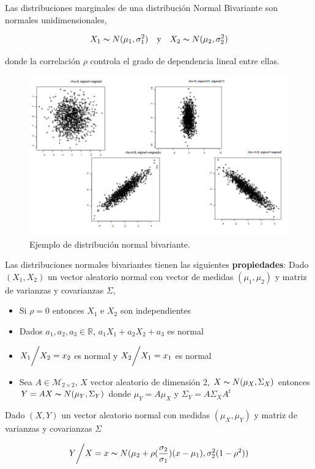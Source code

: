 Las distribuciones marginales de una distribución Normal Bivariante son normales unidimensionales,

\[ X_1\thicksim N(\mu_1,\sigma_1^2) \quad \text{y} \quad X_2\thicksim N(\mu_2,\sigma_2^2) \]

donde la correlación $\rho$ controla el grado de dependencia lineal entre ellas.

\newpage

\begin{figure}[htbp]
    \center
    \includegraphics[scale=0.5]{img/GraficosNormalBivariable.png}
\caption{Ejemplo de distribución normal bivariante.}
\end{figure}

Las distribuciones normales bivariantes tienen las siguientes \textbf{propiedades}:
Dado $(X_1,X_2)$ un vector aleatorio normal con vector de medidas $(\mu_1,\mu_2)$ y matriz de varianzas y covarianzas $\Sigma$,
\begin{itemize}
    \item Si $\rho = 0$ entonces $X_1$ e $X_2$ son independientes
    \item Dados $a_1,a_2,a_3 \in \mathbb{R}$, $a_1X_1 + a_2X_2 + a_3$ es normal
    \item $X_1 \bigg{/} X_2 = x_2$ es normal y $X_2 \bigg{/} X_1 = x_1$ es normal
    \item Sea $A \in \mathcal{M}_{2\times2}$, $X$ vector aleatorio de dimensión 2, $X\thicksim N(\mu_X, \Sigma_X)$ entonces \\ $Y=AX\thicksim N(\mu_Y, \Sigma_Y)$ donde $\mu_Y = A\mu_X$ y $\Sigma_Y = A\Sigma_XA^t$
\end{itemize}

Dado $(X, Y)$ un vector aleatorio normal con medidas $(\mu_X, \mu_Y)$ y matriz de varianzas y covarianzas $\Sigma$

\[ Y \bigg{/} X = x \thicksim N(\mu_2 + \rho(\frac{\sigma_2}{\sigma_1})(x-\mu_1), \sigma_2^2(1-\rho^2)) \]

